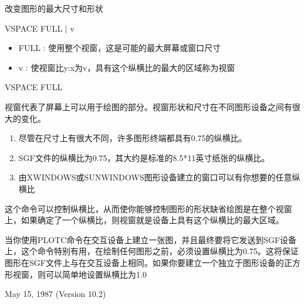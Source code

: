\label{cmd:vspace}

改变图形的最大尺寸和形状

VSPACE FULL | v

\begin{itemize}
\item FULL : 使用整个视窗，这是可能的最大屏幕或窗口尺寸 
\item v : 使视窗比y:x为v，具有这个纵横比的最大的区域称为视窗 
\end{itemize}

VSPACE FULL

视窗代表了屏幕上可以用于绘图的部分。视窗形状和尺寸在不同图形设备之间有很大的变化。
\begin{enumerate}
\item 尽管在尺寸上有很大不同，许多图形终端都具有0.75的纵横比。
\item SGF文件的纵横比为0.75，其大约是标准的8.5*11英寸纸张的纵横比。
\item  由XWINDOWS或SUNWINDOWS图形设备建立的窗口可以有你想要的任意纵横比
\end{enumerate}

这个命令可以控制纵横比，从而使你能够控制图形的形状缺省绘图是在整个视窗上，如果确定了一个纵横比，则视窗就是设备上具有这个纵横比的最大区域。

当你使用PLOTC命令在交互设备上建立一张图，并且最终要将它发送到SGF设备上，这个命令特别有用，在绘制任何图形之前，必须设置纵横比为0.75。这将保证图形在SGF文件上与在交互设备上相同。如果你要建立一个独立于图形设备的正方形视窗，则可以简单地设置纵横比为1.0

May 15, 1987 (Version 10.2)

